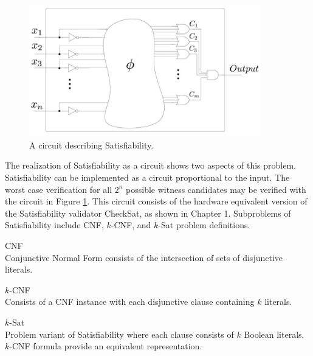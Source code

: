 \begin{figure}[htbp]
\begin{center}

	\includegraphics[width=0.9\textwidth]{figures/circuitLabeled.jpg}

\caption{A circuit describing {\sc Satisfiability}.}
\label{blackBoxSat}
\end{center}
\end{figure}
	
\FloatBarrier

The realization of {\sc Satisfiability} as a circuit shows two aspects of this problem.  {\sc Satisfiability} can be implemented as a circuit proportional to the input.  The worst case verification for all $2^n$ possible witness candidates may be verified with the circuit in Figure \ref{blackBoxSat}.  This circuit consists of the hardware equivalent version of the {\sc Satisfiability} validator {\sc CheckSat}, as shown in Chapter 1.  Subproblems of {\sc Satisfiability} include CNF, $k$-CNF, and $k$-{\sc Sat} problem definitions.

\begin{definition}
CNF\\
Conjunctive Normal Form consists of the intersection of sets of disjunctive literals. 
\end{definition}

\begin{definition}
$k$-CNF\\
Consists of a CNF instance with each disjunctive clause containing $k$ literals.
\end{definition}

\begin{definition}
$k$-{\sc Sat}\\
Problem variant of {\sc Satisfiability} where each clause consists of $k$ Boolean literals.  $k$-CNF formula provide an equivalent representation.
\end{definition}

